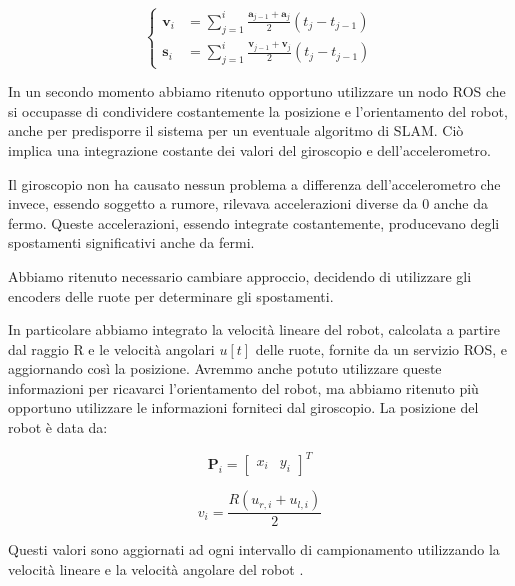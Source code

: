 \documentclass[a4paper]{article}
\begin{document}
	\begin{equation}\label{eq:accel-integration}
		\begin{cases}
			\textbf{v}_i & = \sum_{j=1}^{i} \frac{\textbf{a} _{j-1}+\textbf{a} _j}{2} \left( t_j-t_{j-1} \right) \\
			\textbf{s}_i & = \sum_{j=1}^{i} \frac{\textbf{v} _{j-1}+\textbf{v} _j}{2} \left( t_j-t_{j-1} \right) 
		\end{cases}
	\end{equation}
	
	In un secondo momento abbiamo ritenuto opportuno utilizzare un nodo ROS che
	si occupasse di condividere costantemente la posizione e l'orientamento del
	robot, anche per predisporre il sistema per un eventuale algoritmo di SLAM.
	Ciò implica una integrazione costante dei valori del giroscopio e
	dell'accelerometro. 
	
	Il giroscopio non ha causato nessun problema a differenza
	dell'accelerometro che invece, essendo soggetto a rumore, rilevava
	accelerazioni diverse da 0 anche da fermo. Queste accelerazioni, essendo
	integrate costantemente, producevano degli spostamenti significativi anche
	da fermi. 
	
	Abbiamo ritenuto necessario cambiare approccio, decidendo di utilizzare gli
	encoders delle ruote per determinare gli spostamenti. 
	
	In particolare abbiamo integrato la velocità lineare del robot, calcolata a
	partire dal raggio R e le velocità angolari $u[t]$ delle ruote, fornite da
	un servizio ROS, e aggiornando così la posizione. Avremmo anche potuto
	utilizzare queste informazioni per ricavarci l'orientamento del robot, ma
	abbiamo ritenuto più opportuno utilizzare le informazioni forniteci dal
	giroscopio. La posizione del robot è data da:
	
	\begin{equation}\label{eq:position-vector}
		\textbf{P}_i = \begin{bmatrix}
			  x_i & y_i  
		\end{bmatrix}^T
	\end{equation}
	
	\begin{equation}\label{eq:linear-velocity}
		v_i = \frac{R (u_{r,i}+u_{l,i})}{2}
	\end{equation}
	
	Questi valori sono aggiornati ad ogni intervallo di campionamento utilizzando la velocità lineare e la velocità angolare del robot \cite{572228}.
	
\end{document}
